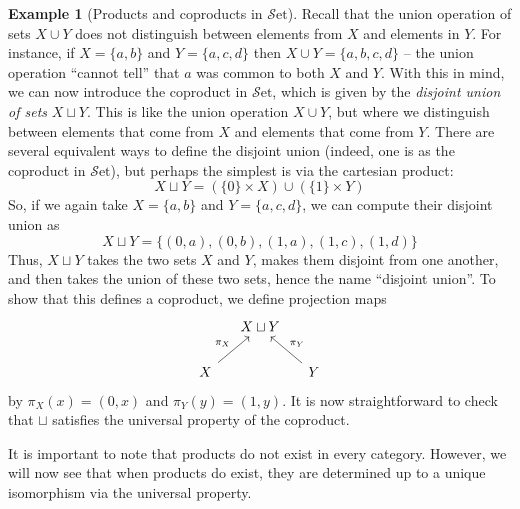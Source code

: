 \documentclass[10pt,oneside]{book}
\def\~#1{\mathscr{#1}}
\newcommand{\Set}{\~S\mathrm{et}}
\theoremstyle{plain}
\theoremstyle{definition}
\newtheorem{ex}[thm]{Example}
\theoremstyle{remark}
\numberwithin{equation}{section}
\numberwithin{figure}{section}
\begin{document}
\begin{ex}[Products and coproducts in $\Set$]
Recall that the union operation of sets $X \cup Y$ does not distinguish between elements from $X$ and elements in $Y$. For instance, if $X = \{a, b\}$ and $Y = \{a, c, d\}$ then $X \cup Y = \{a, b, c, d\}$ -- the union operation ``cannot tell'' that $a$ was common to both $X$ and $Y$. With this in mind, we can now introduce the coproduct in $\Set$, which is given by the \emph{disjoint union of sets} $X \sqcup Y$. This is like the union operation $X \cup Y$, but where we distinguish between elements that come from $X$ and elements that come from $Y$. There are several equivalent ways to define the disjoint union (indeed, one is as the coproduct in $\Set$), but perhaps the simplest is via the cartesian product:
\[X \sqcup Y = \left(  \{0\}  \times X \right) \cup \left( \{1\} \times Y\right)\]
So, if we again take $X = \{a, b\}$ and $Y = \{a, c, d\}$, we can compute their disjoint union as
\[X \sqcup Y = \{(0, a), (0, b), (1, a), (1, c), (1, d)\}\]
Thus, $X \sqcup Y$ takes the two sets $X$ and $Y$, makes them disjoint from one another, and then takes the union of these two sets, hence the name ``disjoint union''. To show that this defines a coproduct, we define projection maps 
\[\begin{tikzcd}[column sep=small]
    & {X \sqcup Y} \\
    X && Y
    \arrow["{\pi_X}", to=1-2, from=2-1]
    \arrow["{\pi_Y}"', to=1-2, from=2-3]
    \end{tikzcd}\]
by $\pi_X(x) = (0, x)$ and $\pi_Y(y) = (1, y)$. It is now straightforward to check that $\sqcup$ satisfies the universal property of the coproduct. 
\end{ex}

It is important to note that products do not exist in every category. However, we will now see that when products do exist, they are determined up to a unique isomorphism via the universal property.
\end{document}
